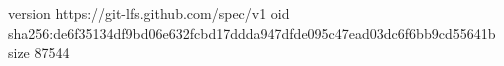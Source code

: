version https://git-lfs.github.com/spec/v1
oid sha256:de6f35134df9bd06e632fcbd17ddda947dfde095c47ead03dc6f6bb9cd55641b
size 87544
